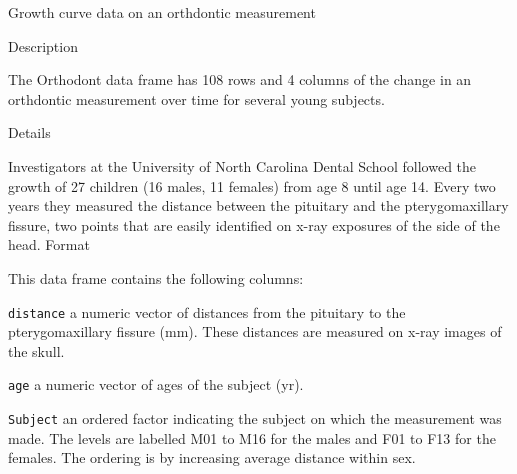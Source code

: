 Growth curve data on an orthdontic measurement


Description

The Orthodont data frame has 108 rows and 4 columns of the change in an orthdontic measurement 
over time for several young subjects.


Details

Investigators at the University of North Carolina Dental School followed the growth of 27 children (16 males, 11 females) from age 8 until age 14. Every two years they measured the distance between the pituitary and the pterygomaxillary fissure, two points that are easily identified on x-ray exposures of the side of the head.
Format

This data frame contains the following columns:

\texttt{distance}
a numeric vector of distances from the pituitary to the pterygomaxillary fissure (mm). These distances are measured on x-ray images of the skull.

\texttt{age}
a numeric vector of ages of the subject (yr).

\texttt{Subject}
an ordered factor indicating the subject on which the measurement was made. The levels are labelled M01 to M16 for the males and F01 to F13 for the females. The ordering is by increasing average distance within sex.

